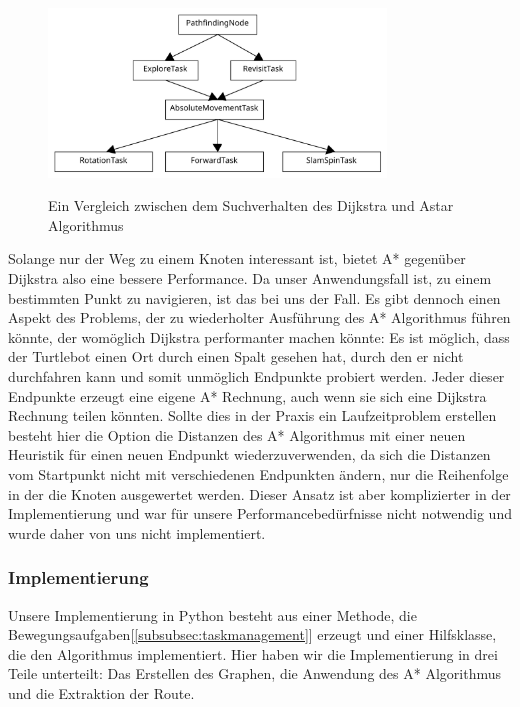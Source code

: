\begin{figure}[h!]
    \caption{Ein Vergleich zwischen dem Suchverhalten des Dijkstra und Astar Algorithmus} %
\includegraphics[width=0.8\textwidth]{img/TaskDiagram}\label{fig:dijkstra_v_astar}
\centering
\end{figure}

Solange nur der Weg zu einem Knoten interessant ist, bietet A* gegenüber Dijkstra also eine bessere Performance.
Da unser Anwendungsfall ist, zu einem bestimmten Punkt zu navigieren, ist das bei uns der Fall.
Es gibt dennoch einen Aspekt des Problems, der zu wiederholter Ausführung des A* Algorithmus führen könnte, der womöglich
Dijkstra performanter machen könnte: Es ist möglich, dass der Turtlebot einen Ort durch einen Spalt gesehen hat, durch
den er nicht durchfahren kann und somit unmöglich Endpunkte probiert werden.
Jeder dieser Endpunkte erzeugt eine eigene A* Rechnung, auch wenn sie sich eine Dijkstra Rechnung teilen könnten.
Sollte dies in der Praxis ein Laufzeitproblem erstellen besteht hier die Option die Distanzen des A* Algorithmus mit
einer neuen Heuristik für einen neuen Endpunkt wiederzuverwenden, da sich die Distanzen vom Startpunkt nicht mit
verschiedenen Endpunkten ändern, nur die Reihenfolge in der die Knoten ausgewertet werden.
Dieser Ansatz ist aber komplizierter in der Implementierung und war für unsere Performancebedürfnisse nicht notwendig und
wurde daher von uns nicht implementiert.
\subsubsection{Implementierung}
Unsere Implementierung in Python besteht aus einer Methode, die Bewegungsaufgaben[\ref{subsubsec:taskmanagement}] erzeugt
und einer Hilfsklasse, die den Algorithmus implementiert.
Hier haben wir die Implementierung in drei Teile unterteilt: Das Erstellen des Graphen, die Anwendung des A* Algorithmus
und die Extraktion der Route.\\

